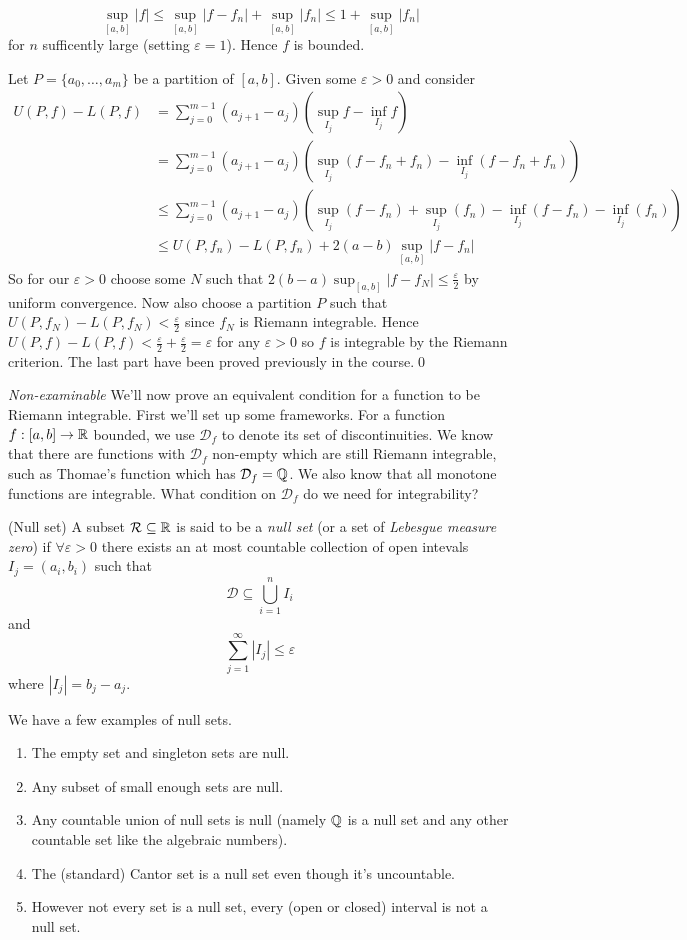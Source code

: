\documentclass{article}
\newcommand{\eps}{\varepsilon}
\begin{document}
\pf 
\[
	\sup_{[a,b]}|f|\le \sup_{[a,b]}|f-f_n|+\sup_{[a,b]}|f_n|\le 1+\sup_{[a,b]}|f_n|
\]
for $ n $ sufficently large (setting $ \eps=1 $). Hence $ f $ is bounded.\par
Let $ P=\{a_0,\dots, a_m\} $ be a partition of $ [a,b] $. Given some $ \eps>0 $ and consider
\begin{align*}
	U(P,f)-L(P,f)&=\sum_{j=0}^{m-1}(a_{j+1}-a_j)\left(\sup_{I_j}f-\inf_{I_j}f\right)\\
	&=\sum_{j=0}^{m-1}(a_{j+1}-a_j)\left(\sup_{I_j}(f-f_n+f_n)-\inf_{I_j}(f-f_n+f_n)\right)\\
	&\le \sum_{j=0}^{m-1}(a_{j+1}-a_j)\left(\sup_{I_j}(f-f_n)+\sup_{I_j}(f_n)-\inf_{I_j}(f-f_n)-\inf_{I_j}(f_n)\right)\\
	&\le U(P,f_n)-L(P,f_n)+2(a-b)\sup_{[a,b]}|f-f_n|
\end{align*}
So for our $ \eps> 0$ choose some $ N $ such that $ 2(b-a)\sup_{[a,b]}|f-f_N|\le\frac \eps 2 $ by uniform convergence. Now also choose a partition $ P $ such that $ U(P,f_N)-L(P,f_N)<\frac \eps2 $ since $ f_N $ is Riemann integrable. Hence $ U(P,f)-L(P,f)<\frac \eps 2+ \frac\eps 2=\eps $ for any $ \eps>0 $ so $ f $ is integrable by the Riemann criterion. The last part have been proved previously in the course.\qed\par
\textit{Non-examinable} We'll now prove an equivalent condition for a function to be Riemann integrable. First we'll set up some frameworks. For a function $ f:[a,b]\to\mathbb{R} $ bounded, we use $ \mathcal D_f $ to denote its set of discontinuities. We know that there are functions with $ \mathcal D_f $ non-empty which are still Riemann integrable, such as Thomae's function which has $ \mathcal D_f=\mathbb{Q} $. We also know that all monotone functions are integrable. What condition on $ \mathcal D_f $ do we need for integrability?
\begin{definition}
	(Null set) A subset $ \mathcal R\subseteq \mathbb{R} $ is said to be a \textit{null set} (or a set of \textit{Lebesgue measure zero}) if $ \forall\eps>0 $ there exists an at most countable collection of open intevals $ I_j=(a_i,b_i) $ such that
	\[
		\mathcal D\subseteq \bigcup_{i=1}^nI_i
	\]
	and
\[
	\sum_{j=1}^\infty|I_j|\le \eps
\]
where $ |I_j|=b_j-a_j $.
\end{definition}
We have a few examples of null sets.
\begin{enumerate}
	\item The empty set and singleton sets are null.
	\item Any subset of small enough sets are null.
	\item Any countable union of null sets is null (namely $ \mathbb{Q} $ is a null set and any other countable set like the algebraic numbers).
	\item The (standard) Cantor set is a null set even though it's uncountable.
	\item However not every set is a null set, every (open or closed) interval is not a null set.
\end{enumerate}
\end{document}
